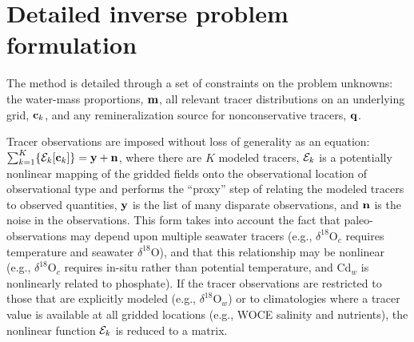 \documentclass[agums]{aguplus}  %
\begin{document}

\newpage

\section{Detailed inverse problem formulation}
\label{sec:proxy}

The method is detailed through a set of constraints on the problem
unknowns: the water-mass proportions, ${\bf m}$, all relevant tracer
distributions on an underlying grid, ${\bf c}_k$, and any
remineralization source for nonconservative tracers, ${\bf q}$.


Tracer observations are imposed without loss of generality as an
equation: $\sum^K_{k=1} \{ {\cal E}_k[ {\bf c}_k] \} = {\bf y} + {\bf
  n}$, where there are $K$ modeled tracers, ${\cal E}_k$ is a
potentially nonlinear mapping of the gridded fields onto the observational
location of observational type and performs the ``proxy'' step of
relating the modeled tracers to observed quantities, ${\bf y}$ is the
list of many disparate observations, and ${\bf n}$ is the noise in the
observations. This form takes into account the fact that
paleo-observations may depend upon multiple seawater tracers (e.g.,
$\delta^{18}$O$_c$ requires temperature and seawater $\delta^{18}$O),
and that this relationship may be nonlinear (e.g., $\delta^{18}$O$_c$
requires in-situ rather than potential temperature, and Cd$_w$ is
nonlinearly related to phosphate). If the tracer observations are
restricted to those that are explicitly modeled (e.g.,
$\delta^{18}$O$_w$) or to climatologies where a tracer value is
available at all gridded locations (e.g., WOCE salinity and
nutrients), the nonlinear function ${\cal E}_k$ is reduced to a
matrix. %
\end{document}
